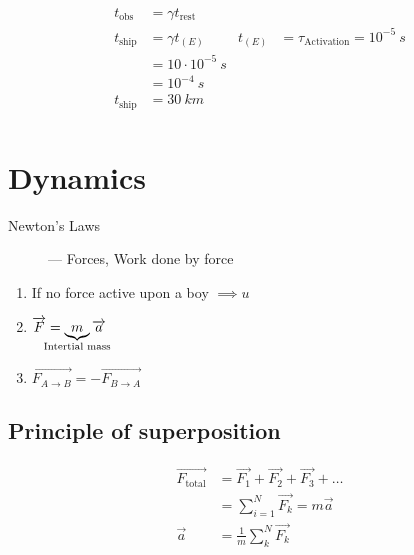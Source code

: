 \documentclass[12pt]{article}
\begin{document}
\begin{align*}
	t_\text{obs}             & = \gamma t_\text{rest}                                                                          \\
	t_\text{ship}            & = \gamma t_{(E)}                              & t_{(E)} & = \tau_\text{Activation} = 10^{-5} ~s \\
	                         & = 10 \cdot 10^{-5} ~ s                                                                          \\
	                         & = 10^{-4} ~ s                                                                                   \\
	t_\text{ship}            & = 30 ~km                                                                                        \\
\end{align*}

\section{Dynamics}
\begin{description}
	\item[Newton's Laws] --- Forces, Work done by force
\end{description}

\begin{enumerate}
	\item If no force active upon a boy $\implies u$
	\item $\overrightarrow{F} = \underbrace{m}_{\hidewidth \text{Intertial mass}\hidewidth} \overrightarrow{a}$
	\item $\overrightarrow{F_{A \to B}} = -\overrightarrow{F_{B \to A}}$
\end{enumerate}

\subsection{Principle of superposition}
\begin{align*}
	\overrightarrow{F_\text{total}} & = \overrightarrow{F_1} + \overrightarrow{F_2} + \overrightarrow{F_3} + \hdots \\
	                                & = \displaystyle\sum_{i=1}^N \overrightarrow{F_k} = m \overrightarrow{a}       \\
	\overrightarrow{a}              & = \frac{1}{m} \displaystyle\sum_k^N \overrightarrow{F_k}
\end{align*}
\end{document}

